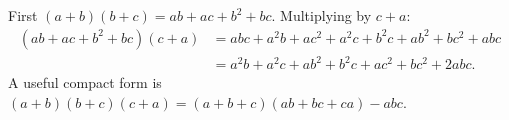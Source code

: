 First $(a+b)(b+c)=ab+ac+b^2+bc$. Multiplying by $c+a$:
\[
\begin{aligned}
(ab+ac+b^2+bc)(c+a)&=abc+a^2b+ac^2+a^2c+b^2c+ab^2+bc^2+abc\\
&=\boxed{a^2b+a^2c+ab^2+b^2c+ac^2+bc^2+2abc}.
\end{aligned}
\]
A useful compact form is $(a+b)(b+c)(c+a)=(a+b+c)(ab+bc+ca)-abc$.

